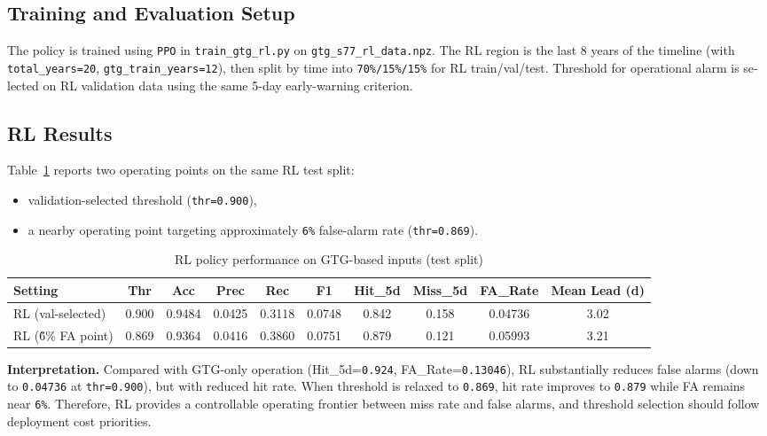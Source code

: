 \documentclass[12pt,a4paper]{article}
\begin{document}
\begin{latin}
\subsection{Training and Evaluation Setup}
The policy is trained using \texttt{PPO} in \texttt{train\_gtg\_rl.py} on \texttt{gtg\_s77\_rl\_data.npz}.
The RL region is the last 8 years of the timeline (with \texttt{total\_years=20}, \texttt{gtg\_train\_years=12}), then split by time into \texttt{70\%/15\%/15\%} for RL train/val/test.
Threshold for operational alarm is selected on RL validation data using the same 5-day early-warning criterion.

\subsection{RL Results}
Table~\ref{tab:rl_results} reports two operating points on the same RL test split:
\begin{itemize}
\item validation-selected threshold (\texttt{thr=0.900}),
\item a nearby operating point targeting approximately \texttt{6\%} false-alarm rate (\texttt{thr=0.869}).
\end{itemize}

\begin{table}[H]
\centering
\caption{RL policy performance on GTG-based inputs (test split)}
\label{tab:rl_results}
\begin{tabular}{lccccccccc}
\toprule
Setting & Thr & Acc & Prec & Rec & F1 & Hit\_5d & Miss\_5d & FA\_Rate & Mean Lead (d) \\
\midrule
RL (val-selected) & 0.900 & 0.9484 & 0.0425 & 0.3118 & 0.0748 & 0.842 & 0.158 & 0.04736 & 3.02 \\
RL (\~6\% FA point) & 0.869 & 0.9364 & 0.0416 & 0.3860 & 0.0751 & 0.879 & 0.121 & 0.05993 & 3.21 \\
\bottomrule
\end{tabular}
\end{table}

\noindent\textbf{Interpretation.}
Compared with GTG-only operation (Hit\_5d=\texttt{0.924}, FA\_Rate=\texttt{0.13046}), RL substantially reduces false alarms (down to \texttt{0.04736} at \texttt{thr=0.900}), but with reduced hit rate.
When threshold is relaxed to \texttt{0.869}, hit rate improves to \texttt{0.879} while FA remains near \texttt{6\%}.
Therefore, RL provides a controllable operating frontier between miss rate and false alarms, and threshold selection should follow deployment cost priorities.


\end{latin}
\end{document}
